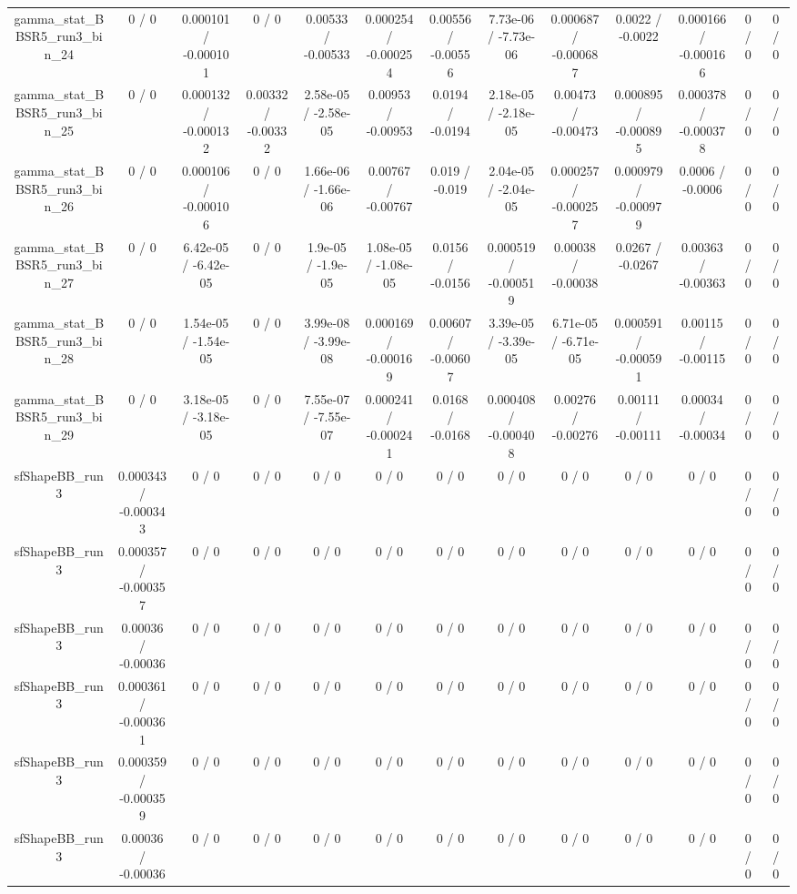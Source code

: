 \documentclass[10pt]{article}
\begin{document}
\begin{table}[htbp]
\begin{center}
\begin{tabular}{|c|c|c|c|c|c|c|c|c|c|c|c|c|}
  gamma_stat_BBSR5_run3_bin_24 & 0 / 0 & 0.000101 / -0.000101 & 0 / 0 & 0.00533 / -0.00533 & 0.000254 / -0.000254 & 0.00556 / -0.00556 & 7.73e-06 / -7.73e-06 & 0.000687 / -0.000687 & 0.0022 / -0.0022 & 0.000166 / -0.000166 & 0 / 0 & 0 / 0 \\ 
  gamma_stat_BBSR5_run3_bin_25 & 0 / 0 & 0.000132 / -0.000132 & 0.00332 / -0.00332 & 2.58e-05 / -2.58e-05 & 0.00953 / -0.00953 & 0.0194 / -0.0194 & 2.18e-05 / -2.18e-05 & 0.00473 / -0.00473 & 0.000895 / -0.000895 & 0.000378 / -0.000378 & 0 / 0 & 0 / 0 \\ 
  gamma_stat_BBSR5_run3_bin_26 & 0 / 0 & 0.000106 / -0.000106 & 0 / 0 & 1.66e-06 / -1.66e-06 & 0.00767 / -0.00767 & 0.019 / -0.019 & 2.04e-05 / -2.04e-05 & 0.000257 / -0.000257 & 0.000979 / -0.000979 & 0.0006 / -0.0006 & 0 / 0 & 0 / 0 \\ 
  gamma_stat_BBSR5_run3_bin_27 & 0 / 0 & 6.42e-05 / -6.42e-05 & 0 / 0 & 1.9e-05 / -1.9e-05 & 1.08e-05 / -1.08e-05 & 0.0156 / -0.0156 & 0.000519 / -0.000519 & 0.00038 / -0.00038 & 0.0267 / -0.0267 & 0.00363 / -0.00363 & 0 / 0 & 0 / 0 \\ 
  gamma_stat_BBSR5_run3_bin_28 & 0 / 0 & 1.54e-05 / -1.54e-05 & 0 / 0 & 3.99e-08 / -3.99e-08 & 0.000169 / -0.000169 & 0.00607 / -0.00607 & 3.39e-05 / -3.39e-05 & 6.71e-05 / -6.71e-05 & 0.000591 / -0.000591 & 0.00115 / -0.00115 & 0 / 0 & 0 / 0 \\ 
  gamma_stat_BBSR5_run3_bin_29 & 0 / 0 & 3.18e-05 / -3.18e-05 & 0 / 0 & 7.55e-07 / -7.55e-07 & 0.000241 / -0.000241 & 0.0168 / -0.0168 & 0.000408 / -0.000408 & 0.00276 / -0.00276 & 0.00111 / -0.00111 & 0.00034 / -0.00034 & 0 / 0 & 0 / 0 \\ 
  sfShapeBB_run3 & 0.000343 / -0.000343 & 0 / 0 & 0 / 0 & 0 / 0 & 0 / 0 & 0 / 0 & 0 / 0 & 0 / 0 & 0 / 0 & 0 / 0 & 0 / 0 & 0 / 0 \\ 
  sfShapeBB_run3 & 0.000357 / -0.000357 & 0 / 0 & 0 / 0 & 0 / 0 & 0 / 0 & 0 / 0 & 0 / 0 & 0 / 0 & 0 / 0 & 0 / 0 & 0 / 0 & 0 / 0 \\ 
  sfShapeBB_run3 & 0.00036 / -0.00036 & 0 / 0 & 0 / 0 & 0 / 0 & 0 / 0 & 0 / 0 & 0 / 0 & 0 / 0 & 0 / 0 & 0 / 0 & 0 / 0 & 0 / 0 \\ 
  sfShapeBB_run3 & 0.000361 / -0.000361 & 0 / 0 & 0 / 0 & 0 / 0 & 0 / 0 & 0 / 0 & 0 / 0 & 0 / 0 & 0 / 0 & 0 / 0 & 0 / 0 & 0 / 0 \\ 
  sfShapeBB_run3 & 0.000359 / -0.000359 & 0 / 0 & 0 / 0 & 0 / 0 & 0 / 0 & 0 / 0 & 0 / 0 & 0 / 0 & 0 / 0 & 0 / 0 & 0 / 0 & 0 / 0 \\ 
  sfShapeBB_run3 & 0.00036 / -0.00036 & 0 / 0 & 0 / 0 & 0 / 0 & 0 / 0 & 0 / 0 & 0 / 0 & 0 / 0 & 0 / 0 & 0 / 0 & 0 / 0 & 0 / 0 \\ 

\end{tabular}
\end{center}
\end{table}
\end{document}
